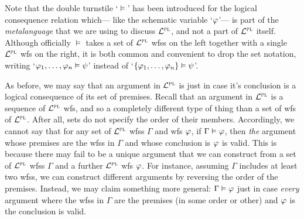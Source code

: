 Note that the double turnstile `$\vDash$' has been introduced for the logical consequence relation which--- like the schematic variable `$\varphi$'--- is part of the \emph{metalanguage} that we are using to discuss $\mathcal{L}^{\textsc{pl}}$, and not a part of $\mathcal{L}^{\textsc{pl}}$ itself.
Although officially $\vDash$ takes a set of $\mathcal{L}^{\textsc{pl}}$ wfss on the left together with a single $\mathcal{L}^{\textsc{pl}}$ wfs on the right, it is both common and convenient to drop the set notation, writing `$\varphi_1,\ldots,\varphi_n \vDash \psi$' instead of `$\lbrace\varphi_1,\ldots,\varphi_n\rbrace \vDash \psi$'.

As before, we may say that an argument in $\mathcal{L}^{\textsc{pl}}$ is  just in case it's conclusion is a logical consequence of its set of premises.
Recall that an argument in $\mathcal{L}^{\textsc{pl}}$ is a sequence of $\mathcal{L}^{\textsc{pl}}$ wfs, and so a completely different type of thing than a set of wfs of $\mathcal{L}^{\textsc{pl}}$.
After all, sets do not specify the order of their members.
Accordingly, we cannot say that for any set of $\mathcal{L}^{\textsc{pl}}$ wfss $\Gamma$ and wfs $\varphi$, if $\Gamma \vDash \varphi$, then \textit{the} argument whose premises are the wfss in $\Gamma$ and whose conclusion is $\varphi$ is valid.
This is because there may fail to be a unique argument that we can construct from a set of $\mathcal{L}^{\textsc{pl}}$ wfss $\Gamma$ and a further $\mathcal{L}^{\textsc{pl}}$ wfs $\varphi$.
For instance, assuming $\Gamma$ includes at least two wfss, we can construct different arguments by reversing the order of the premises.
Instead, we may claim something more general: $\Gamma \vDash \varphi$ just in case \textit{every} argument where the wfss in $\Gamma$ are the premises (in some order or other) and $\varphi$ is the conclusion is valid.


